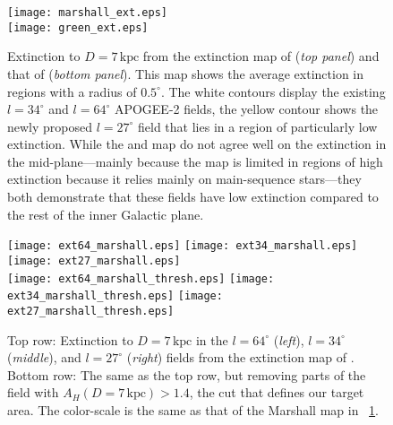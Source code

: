 \documentclass[12pt,preprint]{aastex}
\begin{document}
\begin{figure}[t!]
\begin{center}
\texttt{[image: marshall\_ext.eps]}\\
\texttt{[image: green\_ext.eps]}
\end{center}
\caption{Extinction to $D=7\,\mathrm{kpc}$ from the extinction map of
  \citet{Marshall06a} (\emph{top panel}) and that of \citet{Green15a}
  (\emph{bottom panel}). This map shows the average extinction in
  regions with a radius of $0.5^\circ$. The white contours display the
  existing $l=34^\circ$ and $l=64^\circ$ APOGEE-2 fields, the yellow
  contour shows the newly proposed $l=27^\circ$ field that lies in a
  region of particularly low extinction. While the \citet{Marshall06a}
  and \citet{Green15a} map do not agree well on the extinction in the
  mid-plane---mainly because the \citet{Green15a} map is limited in
  regions of high extinction because it relies mainly on main-sequence
  stars---they both demonstrate that these fields have low extinction
  compared to the rest of the inner Galactic plane.}\label{fig:ext}
\end{figure}

\begin{figure}[t!]
\begin{center}
\texttt{[image: ext64\_marshall.eps]}
\texttt{[image: ext34\_marshall.eps]}
\texttt{[image: ext27\_marshall.eps]}\\
\texttt{[image: ext64\_marshall\_thresh.eps]}
\texttt{[image: ext34\_marshall\_thresh.eps]}
\texttt{[image: ext27\_marshall\_thresh.eps]}
\end{center}
\caption{Top row: Extinction to $D=7\,\mathrm{kpc}$ in the
  $l=64^\circ$ (\emph{left}), $l=34^\circ$ (\emph{middle}), and
  $l=27^\circ$ (\emph{right}) fields from the extinction map of
  \citet{Marshall06a}. Bottom row: The same as the top row, but
  removing parts of the field with $A_H(D=7\,\mathrm{kpc}) > 1.4$, the
  cut that defines our target area. The color-scale is the same as that
  of the Marshall map in
  \figurename~\ref{fig:ext}.}\label{fig:extfield}
\end{figure}
\end{document}
